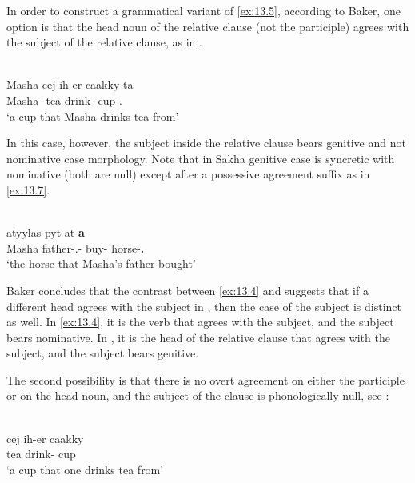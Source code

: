 \documentclass[output=paper]{langsci/langscibook}
\begin{document}
In order to construct a grammatical variant of \eqref{ex:13.5}, according to
Baker, one option is that the head noun of the relative clause (not the
participle) agrees with the subject of the relative clause, as in
.

\ea%
    \label{ex:13.6} \parencite[30]{Baker2015}\\
    \gll  Masha cej ih-er caakky-ta\\
          Masha-\Gen{}  tea drink-\Aor{}  cup-\Tsg.\Poss{}\\
    \glt  ‘a cup that Masha drinks tea from’
\z

In this case, however, the subject inside the relative clause bears genitive
and not nominative case morphology. Note that in Sakha genitive case is
syncretic with nominative (both are null) except after a possessive agreement
suffix as in \eqref{ex:13.7}.

\ea%
    \label{ex:13.7} \parencite[30]{Baker2015}\\
     atyylas-pyt at-\textbf{a}\\
          {} Masha father-\Tsg.\Poss{}-\Gen{} {} buy-\Ptcp{}  horse-\textbf{\Tsg.\Poss{}}\\
    \glt  ‘the horse that Masha’s father bought’  \citet[30]{Baker2015}
\z

Baker concludes that the contrast between \eqref{ex:13.4} and
 suggests that if a different head agrees with the subject in
, then the case of the subject is distinct as well. In
\eqref{ex:13.4}, it is the verb that agrees with the subject, and the
subject bears nominative. In , it is the
head of the relative clause that agrees with the subject, and the subject bears
genitive.

The second possibility is that there is no overt agreement on either the
participle or on the head noun, and the subject of the clause is phonologically
null, see :

\ea%
    \label{ex:13.8} \parencite[30]{Baker2015}\\
    \gll    cej ih-er caakky\\
            tea drink-\Aor{}  cup\\
    \glt    ‘a cup that one drinks tea from’
\z
\end{document}

